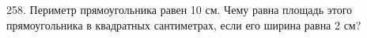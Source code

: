 258. Периметр прямоугольника равен 10 см. Чему равна площадь этого прямоугольника в квадратных сантиметрах, если его ширина равна 2 см?\\

